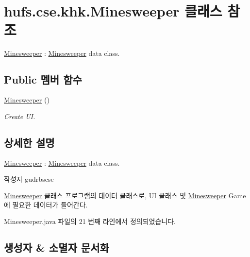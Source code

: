 \hypertarget{classhufs_1_1cse_1_1khk_1_1_minesweeper}{}\section{hufs.\+cse.\+khk.\+Minesweeper 클래스 참조}
\label{classhufs_1_1cse_1_1khk_1_1_minesweeper}


\hyperlink{classhufs_1_1cse_1_1khk_1_1_minesweeper}{Minesweeper} \+: \hyperlink{classhufs_1_1cse_1_1khk_1_1_minesweeper}{Minesweeper} data class.  


\subsection*{Public 멤버 함수}
\begin{DoxyCompactItemize}
\item 
\hyperlink{classhufs_1_1cse_1_1khk_1_1_minesweeper_ae984f5f16cc438084f11ffe5fa9cf4e8}{Minesweeper} ()
\begin{DoxyCompactList}\small\item\em Create UI. \end{DoxyCompactList}\end{DoxyCompactItemize}


\subsection{상세한 설명}
\hyperlink{classhufs_1_1cse_1_1khk_1_1_minesweeper}{Minesweeper} \+: \hyperlink{classhufs_1_1cse_1_1khk_1_1_minesweeper}{Minesweeper} data class. 

\begin{DoxyAuthor}{작성자}
gudrbscse
\end{DoxyAuthor}
\hyperlink{classhufs_1_1cse_1_1khk_1_1_minesweeper}{Minesweeper} 클래스 프로그램의 데이터 클래스로, UI 클래스 및 \hyperlink{classhufs_1_1cse_1_1khk_1_1_minesweeper}{Minesweeper} Game 에 필요한 데이터가 들어간다. 

Minesweeper.\+java 파일의 21 번째 라인에서 정의되었습니다.



\subsection{생성자 \& 소멸자 문서화}
